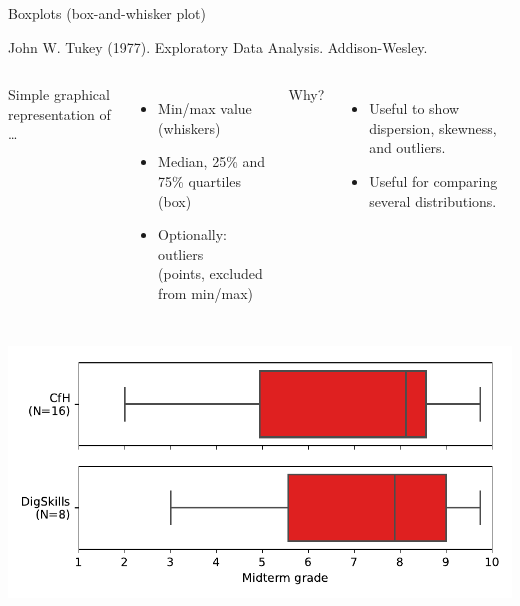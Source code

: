 \documentclass[aspectratio=169,usenames,dvipsnames]{beamer}
\begin{document}
\begin{frame}{Boxplots (box-and-whisker plot)}
    \begin{reference}
        John W. Tukey (1977). Exploratory Data Analysis. Addison-Wesley.
    \end{reference}
    \begin{columns}[T]
            Simple graphical representation of \dots

            \begin{itemize}
                \item Min/max value (whiskers)
                \item Median, 25\% and 75\% quartiles (box)
                \item Optionally: outliers \\
                    (points, excluded from min/max)
            \end{itemize}

            Why?
            \begin{itemize}
                \item Useful to show dispersion, skewness, and outliers.

                \item Useful for comparing several distributions.
            \end{itemize}
    \end{columns}

    \pause\centering
    \includegraphics[height=0.5\textheight]{fig/boxplot}
\end{frame}

\end{document}
